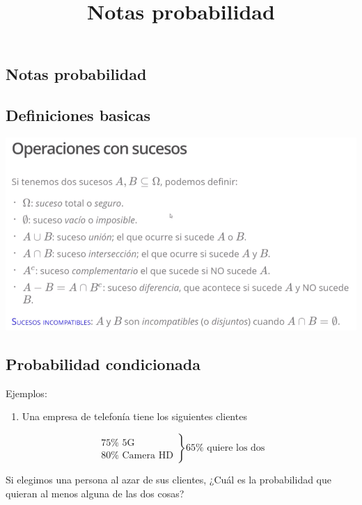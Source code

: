 \documentclass[
]{article}
\title{Notas probabilidad}
\author{}
\date{\vspace{-2.5em}}
\providecommand{\tightlist}{%
  \setlength{\itemsep}{0pt}\setlength{\parskip}{0pt}}
\begin{document}
\maketitle

\hypertarget{notas-probabilidad}{%
\subsection{Notas probabilidad}\label{notas-probabilidad}}

\hypertarget{definiciones-basicas}{%
\subsection{Definiciones basicas}\label{definiciones-basicas}}

\includegraphics{images/paste-1AE55E3B.png}

\hypertarget{probabilidad-condicionada}{%
\subsection{Probabilidad condicionada}\label{probabilidad-condicionada}}

Ejemplos:

\begin{enumerate}
\def\labelenumi{\arabic{enumi}.}
\tightlist
\item
  Una empresa de telefonía tiene los siguientes clientes
\end{enumerate}

\[
\left.
\begin{array}{ll}
\text{75%
\text{80%
\end{array}
\right \}
\text{65%
\]

Si elegimos una persona al azar de sus clientes, ¿Cuál es la
probabilidad que quieran al menos alguna de las dos cosas?
\end{document}
